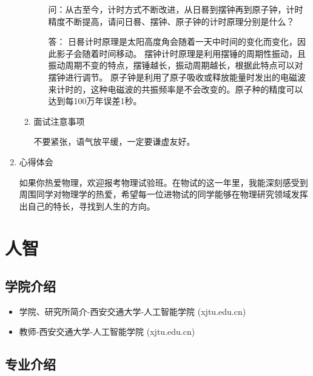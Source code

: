 \documentclass[zihao=-4,fontset=none]{Beautybook-CN}
\begin{document}
\begin{enumerate}
\begin{enumerate}
\begin{itemize}
	      	      	      问：从古至今，计时方式不断改进，从日晷到摆钟再到原子钟，计时精度不断提高，请问日晷、摆钟、原子钟的计时原理分别是什么？
	      	      	      
	      	      	      答： 日晷计时原理是太阳高度角会随着一天中时间的变化而变化，因此影子会随着时间移动。 摆钟计时原理是利用摆锤的周期性振动，且振动周期不变的特点，摆锤越长，振动周期越长，根据此特点可以对摆钟进行调节。 原子钟是利用了原子吸收或释放能量时发出的电磁波来计时的，这种电磁波的共振频率是不会改变的。原子种的精度可以达到每100万年误差1秒。
	      	      \end{itemize}
	      	      	      	      	      	          
	      	\item 面试注意事项
        
	      	      不要紧张，语气放平缓，一定要谦虚友好。
	      \end{enumerate}    
	      	      	      
	\item 心得体会
	       
	      如果你热爱物理，欢迎报考物理试验班。在物试的这一年里，我能深刻感受到周围同学对物理学的热爱，希望每一位进物试的同学能够在物理研究领域发挥出自己的特长，寻找到人生的方向。
\end{enumerate}
\section{人智}

\subsection{学院介绍}

\begin{itemize}	
	\item  学院、研究所简介-西安交通大学-人工智能学院 (xjtu.edu.cn)
	\item 教师-西安交通大学-人工智能学院 (xjtu.edu.cn)
\end{itemize}
\subsection{专业介绍}
\end{document}
